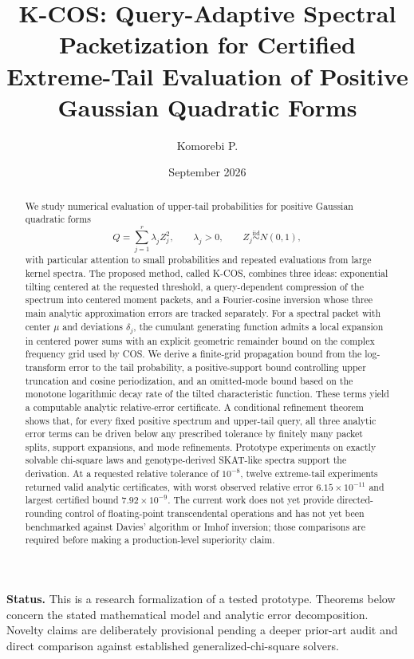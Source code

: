 \documentclass[11pt]{article}
\title{\textbf{K-COS: Query-Adaptive Spectral Packetization for Certified Extreme-Tail Evaluation of Positive Gaussian Quadratic Forms}}
\author{Komorebi P.}
\date{September 2026}
\theoremstyle{definition}
\begin{document}
\maketitle

\begin{abstract}
We study numerical evaluation of upper-tail probabilities for positive Gaussian quadratic forms
\[
Q=\sum_{j=1}^{r}\lambda_j Z_j^2,
\qquad \lambda_j>0,
\qquad Z_j\stackrel{\mathrm{iid}}{\sim}N(0,1),
\]
with particular attention to small probabilities and repeated evaluations from large kernel spectra. The proposed method, called K-COS, combines three ideas: exponential tilting centered at the requested threshold, a query-dependent compression of the spectrum into centered moment packets, and a Fourier-cosine inversion whose three main analytic approximation errors are tracked separately. For a spectral packet with center $\mu$ and deviations $\delta_j$, the cumulant generating function admits a local expansion in centered power sums with an explicit geometric remainder bound on the complex frequency grid used by COS. We derive a finite-grid propagation bound from the log-transform error to the tail probability, a positive-support bound controlling upper truncation and cosine periodization, and an omitted-mode bound based on the monotone logarithmic decay rate of the tilted characteristic function. These terms yield a computable analytic relative-error certificate. A conditional refinement theorem shows that, for every fixed positive spectrum and upper-tail query, all three analytic error terms can be driven below any prescribed tolerance by finitely many packet splits, support expansions, and mode refinements. Prototype experiments on exactly solvable chi-square laws and genotype-derived SKAT-like spectra support the derivation. At a requested relative tolerance of $10^{-8}$, twelve extreme-tail experiments returned valid analytic certificates, with worst observed relative error $6.15\times10^{-11}$ and largest certified bound $7.92\times10^{-9}$. The current work does not yet provide directed-rounding control of floating-point transcendental operations and has not yet been benchmarked against Davies' algorithm or Imhof inversion; those comparisons are required before making a production-level superiority claim.
\end{abstract}

\noindent\textbf{Status.} This is a research formalization of a tested prototype. Theorems below concern the stated mathematical model and analytic error decomposition. Novelty claims are deliberately provisional pending a deeper prior-art audit and direct comparison against established generalized-chi-square solvers.
\end{document}
